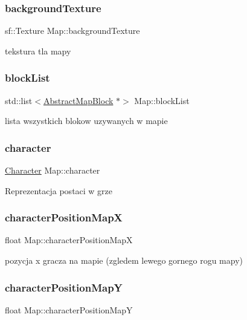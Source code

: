 \subsubsection{\texorpdfstring{background\+Texture}{backgroundTexture}}
{\footnotesize\ttfamily sf\+::\+Texture Map\+::background\+Texture}

tekstura tla mapy \mbox{\label{class_map_ad185fe5369037999533e218f3f7ade8a}} 
\subsubsection{\texorpdfstring{block\+List}{blockList}}
{\footnotesize\ttfamily std\+::list$<$\hyperlink{class_abstract_map_block}{Abstract\+Map\+Block} $\ast$$>$ Map\+::block\+List}

lista wszystkich blokow uzywanych w mapie \mbox{\label{class_map_a00d7fac6e87f2ac95d0182bbb22fdac4}} 
\subsubsection{\texorpdfstring{character}{character}}
{\footnotesize\ttfamily \hyperlink{class_character}{Character} Map\+::character}

Reprezentacja postaci w grze \mbox{\label{class_map_acfd2fda55638ba32a092fac314f9f1c5}} 
\subsubsection{\texorpdfstring{character\+Position\+MapX}{characterPositionMapX}}
{\footnotesize\ttfamily float Map\+::character\+Position\+MapX}

pozycja x gracza na mapie (zgledem lewego gornego rogu mapy) \mbox{\label{class_map_aa4e4d68c7babc74782b973a3b97431ea}} 
\subsubsection{\texorpdfstring{character\+Position\+MapY}{characterPositionMapY}}
{\footnotesize\ttfamily float Map\+::character\+Position\+MapY}

